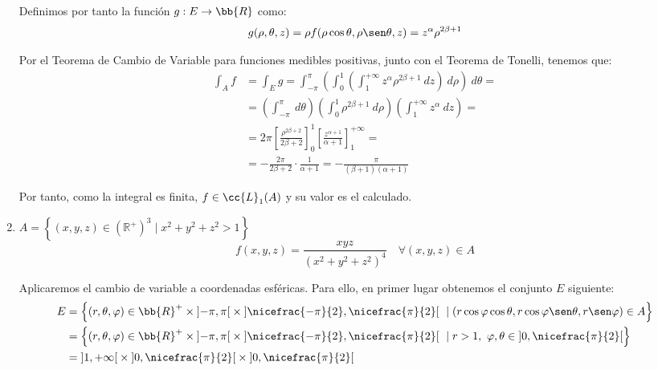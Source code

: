 \begin{ejercicio}
\begin{enumerate}
        Definimos por tanto la función $g: E \to \bb{R}$ como:
        \begin{equation*}
            g(\rho, \theta, z) = \rho f(\rho\cos\theta, \rho\sen\theta, z) = z^\alpha \rho^{2\beta+1}
        \end{equation*}

        Por el Teorema de Cambio de Variable para funciones medibles positivas, junto con el Teorema de Tonelli, tenemos que:
        \begin{align*}
            \int_A f &= \int_E g = \int_{-\pi}^\pi \left( \int_0^1 \left( \int_1^{+\infty} z^\alpha \rho^{2\beta+1}~dz \right)~d\rho \right)~d\theta =\\
            &= \left(\int_{-\pi}^\pi ~d\theta \right) \left( \int_0^1 \rho^{2\beta+1}~d\rho \right) \left( \int_1^{+\infty} z^\alpha ~dz \right) =\\
            &= 2\pi \left[ \frac{\rho^{2\beta+2}}{2\beta+2} \right]_0^1 \left[ \frac{z^{\alpha+1}}{\alpha+1} \right]_1^{+\infty} =\\
            &= -\frac{2\pi}{2\beta+2}\cdot \frac{1}{\alpha+1}
            = -\frac{\pi}{(\beta+1)(\alpha+1)}
        \end{align*}

        Por tanto, como la integral es finita, $f\in \cc{L}_1(A)$ y su valor es el calculado.

        \item \( A = \left\{ (x, y, z) \in (\mathbb{R}^+)^3 \mid x^2 + y^2 + z^2 > 1 \right\} \)
        \[ f(x, y, z) = \frac{x y z}{(x^2 + y^2 + z^2)^4} \quad \forall (x, y, z) \in A \]

        Aplicaremos el cambio de variable a coordenadas esféricas. Para ello, en primer
        lugar obtenemos el conjunto $E$ siguiente:
        \begin{align*}
            E &= \left\{ (r, \theta, \varphi) \in \bb{R}^+\times \left]-\pi, \pi\right[ \times \left] \nicefrac{-\pi}{2},\nicefrac{\pi}{2} \right[ ~\mid (r\cos\varphi\cos\theta, r\cos\varphi\sen\theta, r\sen\varphi) \in A \right\} \\
            &= \left\{ (r, \theta, \varphi) \in \bb{R}^+\times \left]-\pi, \pi\right[ \times \left] \nicefrac{-\pi}{2},\nicefrac{\pi}{2} \right[ ~\mid r > 1,~\varphi,\theta\in \left]0,\nicefrac{\pi}{2}\right[ \right\} \\
            &= \left] 1, +\infty \right[ \times \left] 0, \nicefrac{\pi}{2} \right[ \times \left] 0,\nicefrac{\pi}{2} \right[
        \end{align*}


\end{enumerate}
\end{ejercicio}
